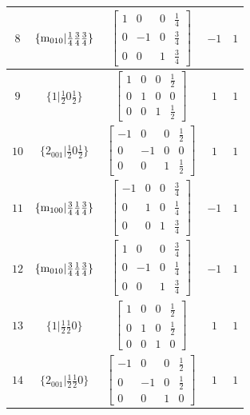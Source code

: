 \documentclass[fleqn,8pt]{jsarticle}
\begin{document}
\begin{longtable}{ccccc}
$ 8 $ & $ \{{\rm m}_{010}|\frac{1}{4} \frac{3}{4} \frac{3}{4}\} $ & $ \begin{bmatrix} 1 & 0 & 0 & \frac{1}{4} \\ 0 & -1 & 0 & \frac{3}{4} \\ 0 & 0 & 1 & \frac{3}{4} \end{bmatrix} $ & $ -1 $ & $ 1 $ \\ \hline
$ 9 $ & $ \{1|\frac{1}{2} 0 \frac{1}{2}\} $ & $ \begin{bmatrix} 1 & 0 & 0 & \frac{1}{2} \\ 0 & 1 & 0 & 0 \\ 0 & 0 & 1 & \frac{1}{2} \end{bmatrix} $ & $ 1 $ & $ 1 $ \\ \hline
$ 10 $ & $ \{2{}_{001}|\frac{1}{2} 0 \frac{1}{2}\} $ & $ \begin{bmatrix} -1 & 0 & 0 & \frac{1}{2} \\ 0 & -1 & 0 & 0 \\ 0 & 0 & 1 & \frac{1}{2} \end{bmatrix} $ & $ 1 $ & $ 1 $ \\ \hline
$ 11 $ & $ \{{\rm m}_{100}|\frac{3}{4} \frac{1}{4} \frac{3}{4}\} $ & $ \begin{bmatrix} -1 & 0 & 0 & \frac{3}{4} \\ 0 & 1 & 0 & \frac{1}{4} \\ 0 & 0 & 1 & \frac{3}{4} \end{bmatrix} $ & $ -1 $ & $ 1 $ \\ \hline
$ 12 $ & $ \{{\rm m}_{010}|\frac{3}{4} \frac{1}{4} \frac{3}{4}\} $ & $ \begin{bmatrix} 1 & 0 & 0 & \frac{3}{4} \\ 0 & -1 & 0 & \frac{1}{4} \\ 0 & 0 & 1 & \frac{3}{4} \end{bmatrix} $ & $ -1 $ & $ 1 $ \\ \hline
$ 13 $ & $ \{1|\frac{1}{2} \frac{1}{2} 0\} $ & $ \begin{bmatrix} 1 & 0 & 0 & \frac{1}{2} \\ 0 & 1 & 0 & \frac{1}{2} \\ 0 & 0 & 1 & 0 \end{bmatrix} $ & $ 1 $ & $ 1 $ \\ \hline
$ 14 $ & $ \{2{}_{001}|\frac{1}{2} \frac{1}{2} 0\} $ & $ \begin{bmatrix} -1 & 0 & 0 & \frac{1}{2} \\ 0 & -1 & 0 & \frac{1}{2} \\ 0 & 0 & 1 & 0 \end{bmatrix} $ & $ 1 $ & $ 1 $ \\ \hline

\end{longtable}
\end{document}

